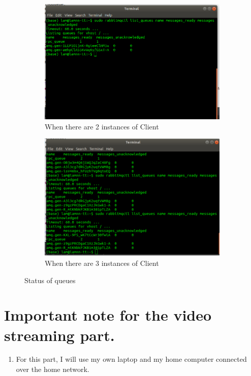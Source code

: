 \documentclass[11pt,a4paper]{article}
\begin{document}
	\begin{figure}[h!]
		\centering
  		\begin{subfigure}[b]{0.4\linewidth}
  		\includegraphics[width=\linewidth]{res-status.png}
    		\caption{When there are 2 instances of Client}
  		\end{subfigure}
  		\begin{subfigure}[b]{0.4\linewidth}
    		\includegraphics[width=\linewidth]{res-status-3.png}
    		\caption{When there are 3 instances of Client}
  		\end{subfigure}
  		\caption{Status of queues}
  		\label{fig:status}
	\end{figure}
	
	\section{Important note for the video streaming part.}
	\begin{enumerate}
		\item For this part, I will use my own laptop and my home computer connected over the home network.
	\end{enumerate}
	
\end{document}
